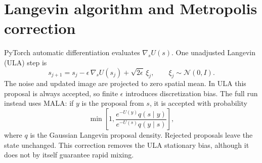 \documentclass[11pt]{article}
\begin{document}
\section{Langevin algorithm and Metropolis correction}

PyTorch automatic differentiation evaluates $\nabla_s U(s)$.  One
unadjusted Langevin (ULA) step is
\begin{equation}
    s_{j+1}=s_j-\epsilon\,\nabla_s U(s_j)
    +\sqrt{2\epsilon}\,\xi_j,
    \qquad \xi_j\sim\mathcal N(0,I).
\end{equation}
The noise and updated image are projected to zero spatial mean.  In ULA this
proposal is always accepted, so finite $\epsilon$ introduces discretization
bias.  The full run instead uses MALA: if $y$ is the proposal from $s$, it is
accepted with probability
\begin{equation}
  \min\!\left[1,
  \frac{e^{-U(y)}q(s\mid y)}{e^{-U(s)}q(y\mid s)}\right],
\end{equation}
where $q$ is the Gaussian Langevin proposal density.  Rejected proposals
leave the state unchanged.  This correction removes the ULA stationary bias,
although it does not by itself guarantee rapid mixing.
\end{document}

